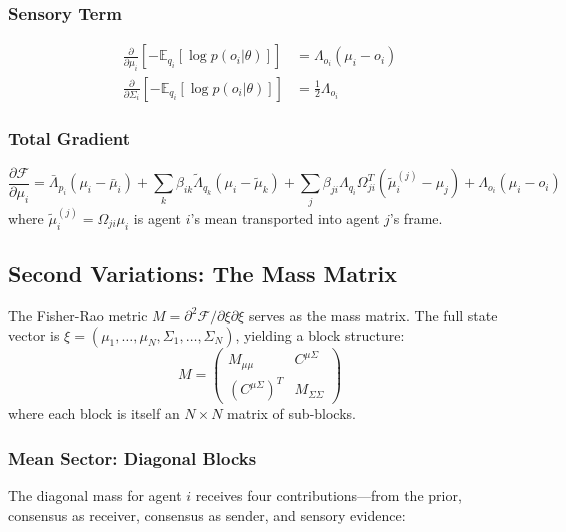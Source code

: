 \documentclass[11pt]{article}
\begin{document}
\subsubsection{Sensory Term}
\begin{align}
\frac{\partial}{\partial \mu_i}\left[-\mathbb{E}_{q_i}[\log p(o_i | \theta)]\right] &= \Lambda_{o_i}(\mu_i - o_i) \\
\frac{\partial}{\partial \Sigma_i}\left[-\mathbb{E}_{q_i}[\log p(o_i | \theta)]\right] &= \frac{1}{2}\Lambda_{o_i}
\end{align}

\subsubsection{Total Gradient}
\begin{equation}
\frac{\partial\mathcal{F}}{\partial\mu_i} = \bar{\Lambda}_{p_i}(\mu_i - \bar{\mu}_i) + \sum_k\beta_{ik}\tilde{\Lambda}_{q_k}(\mu_i - \tilde{\mu}_k) + \sum_j\beta_{ji}\Lambda_{q_i}\Omega_{ji}^T(\tilde{\mu}_i^{(j)} - \mu_j) + \Lambda_{o_i}(\mu_i - o_i)
\label{eq:gradient}
\end{equation}
where $\tilde{\mu}_i^{(j)} = \Omega_{ji}\mu_i$ is agent $i$'s mean transported into agent $j$'s frame.

\subsection{Second Variations: The Mass Matrix}

The Fisher-Rao metric $M = \partial^2\mathcal{F}/\partial\xi\partial\xi$ serves as the mass matrix. The full state vector is $\xi = (\mu_1, \ldots, \mu_N, \Sigma_1, \ldots, \Sigma_N)$, yielding a block structure:
\begin{equation}
M = \begin{pmatrix} M_{\mu\mu} & C^{\mu\Sigma} \\ (C^{\mu\Sigma})^T & M_{\Sigma\Sigma} \end{pmatrix}
\label{eq:mass_block_structure}
\end{equation}
where each block is itself an $N \times N$ matrix of sub-blocks.

\subsubsection{Mean Sector: Diagonal Blocks}

The diagonal mass for agent $i$ receives four contributions---from the prior, consensus as receiver, consensus as sender, and sensory evidence:
\end{document}
